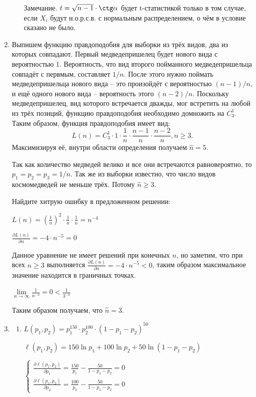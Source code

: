 \begin{enumerate}
\begin{enumerate}
Замечание. $t=\sqrt{n-1}\cdot \ctg \alpha$ будет t-статистикой только в том случае, если $X_i$ будут н.о.р.с.в. с нормальным распределением, о чём в условие сказано не было.
\end{enumerate}
\item Выпишем функцию правдоподобия для выборки из трёх видов, два из которых совпадают. Первый медведепришелец будет нового вида с вероятностью 1. Вероятность, что вид второго пойманного медведепришельца совпадёт с первмым, составляет $1/n$. После этого нужно поймать медведепришельца нового вида – это произойдёт с вероятностью $(n-1)/n$, и ещё одного нового вида – вероятность этого $(n-2)/n$. Поскольку медведепришелец, вид которого встречается дважды, мог встретить на любой из трёх позиций, функцию правдоподобия необходимо домножить на $C_3^1$. Таким образом, функция правдоподобия имеет вид:
\[
L(n) = C_3^1 \cdot 1 \cdot \frac{1}{n} \cdot \frac{n-1}{n} \cdot \frac{n-2}{n}, n \geq 3.
\]
Максимизируя её, внутри области определения получаем $\hat n = 5$.

Так как количество медведей велико и все они встречаются равновероятно, то $p_{1}=p_{2}=p_{3}=1/n$. Так же из выборки известно, что число видов космомедведей не меньше трёх. Потому $\hat{n} \ge 3$.

Найдите хитрую ошибку в предложенном решении:

$L(n)=\left(\frac{1}{n}\right)^{2} \cdot \frac{1}{n}\cdot\frac{1}{n}=n^{-4}$

$\frac{\partial L(n)}{\partial n} = -4\cdot n^{-5}=0$

Данное уравнение не имеет решений при конечных $n$, но заметим, что при всех $n \ge 3$ выполняется $\frac{\partial L(n)}{\partial n} = -4\cdot n^{-5} < 0$, таким образом максимальное значение находится в граничных точках.

$\lim\limits_{n\to\infty}\frac{1}{n^{-4}}=0 < \frac{1}{3^{-4}}$

Таким образом получаем, что $\hat{n}=3$.

\item \begin{enumerate}
\item $L(p_{1},p_{2})=p_{1}^{150}\cdot p_{2}^{100}\cdot(1-p_{1}-p_{2})^{50}$

$\ell(p_{1},p_{2}) = 150\ln p_{1} +100\ln p_{2}+50\ln (1-p_{1}-p_{2})$

$\begin{cases}
\frac{\partial \ell(p_{1},p_{2})}{\partial p_{1}}= \frac{150}{p_{1}} - \frac{50}{1-p_{1}-p_{2}}=0
\\
\frac{\partial \ell(p_{1},p_{2})}{\partial p_{2}}= \frac{100}{p_{2}} - \frac{50}{1-p_{1}-p_{2}}=0
\end{cases}$


\end{enumerate}
\end{enumerate}

